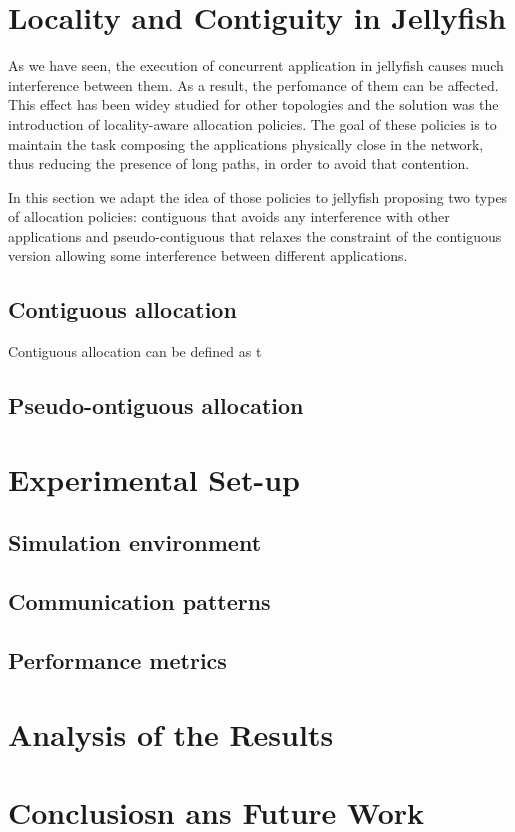 \documentclass{sig-alternate}
\begin{document}
\section{Locality and Contiguity in Jellyfish}
\label{locality}

As we have seen, the execution of concurrent application in jellyfish causes much interference between them. As a result, the perfomance of them can be affected. This effect has been widey studied for other topologies and the solution was the introduction of locality-aware allocation policies. The goal of these policies is to maintain the task composing the applications physically close in the network, thus reducing the presence of long paths, in order to avoid that contention. 

In this section we adapt the idea of those policies to jellyfish proposing two types of allocation policies: contiguous that avoids any interference with other applications and pseudo-contiguous that relaxes the constraint of the contiguous version allowing some interference between different applications. 

\subsection{Contiguous allocation}
\label{contiguous}

Contiguous allocation can be defined as t

\subsection{Pseudo-ontiguous allocation}
\label{contiguous}


\section{Experimental Set-up}
\label{experimental}

\subsection{Simulation environment}
\label{subsec:simulation}


\subsection{Communication patterns}
\label{subsec:communication}

\subsection{Performance metrics}
\label{subsec:performance}


\section{Analysis of the Results}
\label{analysis}

\section{Conclusiosn ans Future Work}
\label{conclusions}




\end{document}
